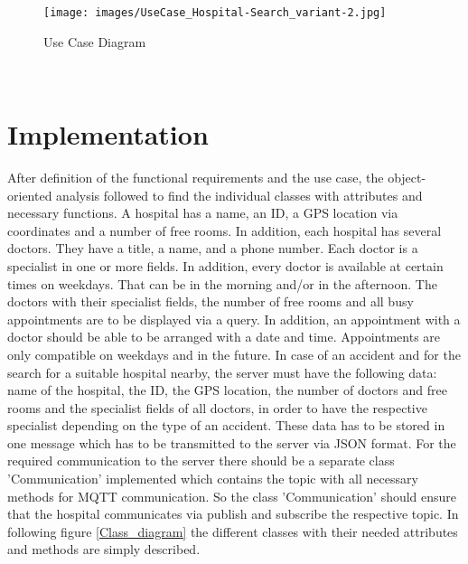 \begin{figure}[H]
\centering
\sidecaption
\texttt{[image: images/UseCase\_Hospital-Search\_variant-2.jpg]}
\caption{Use Case Diagram}
\label{Use_Case}
\end{figure}


\\
\clearpage
\section{Implementation}
\label{sec:4}

After definition of the functional requirements and the use case, the object-oriented analysis followed to find the individual classes with attributes and necessary functions. 
A hospital has a name, an ID, a GPS location via coordinates and a number of free rooms. In addition, each hospital has several doctors. They have a title, a name, and a phone number. Each doctor is a specialist in one or more fields. In addition, every doctor is available at certain times on weekdays. That can be in the morning and/or in the afternoon. The doctors with their specialist fields, the number of free rooms and all busy appointments are to be displayed via a query. In addition, an appointment with a doctor should be able to be arranged with a date and time. Appointments are only compatible on weekdays and in the future. In case of an accident and for the search for a suitable hospital nearby, the server must have the following data: name of the hospital, the ID, the GPS location, the number of doctors and free rooms and the specialist fields of all doctors, in order to have the respective specialist depending on the type of an accident. These data has to be stored in one message which has to be transmitted to the server via JSON format. 
For the required communication to the server there should be a separate class 'Communication' implemented which contains the topic with all necessary methods for MQTT communication. So the class 'Communication' should ensure that the hospital communicates via publish and subscribe the respective topic. 
In following figure \ref{Class_diagram} the different classes with their needed attributes and methods are simply described.

